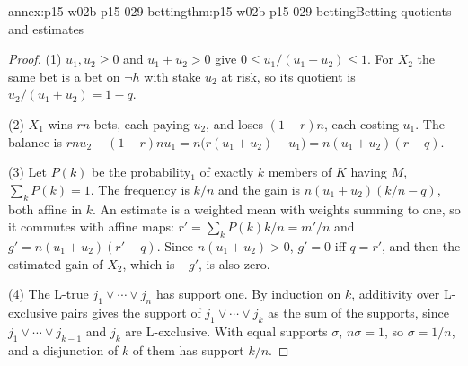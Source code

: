 \begin{annexitem}{annex:p15-w02b-p15-029-betting}{thm:p15-w02b-p15-029-betting}{Betting quotients and estimates}
\begin{proof}
(1) \(u_1,u_2\geq0\) and \(u_1+u_2>0\) give
\(0\leq u_1/(u_1+u_2)\leq1\). For \(X_2\) the same bet is a bet on
\(\neg h\) with stake \(u_2\) at risk, so its quotient is
\(u_2/(u_1+u_2)=1-q\).

(2) \(X_1\) wins \(rn\) bets, each paying \(u_2\), and loses
\((1-r)n\), each costing \(u_1\). The balance is
\(rnu_2-(1-r)nu_1=n\bigl(r(u_1+u_2)-u_1\bigr)=n(u_1+u_2)(r-q)\).

(3) Let \(P(k)\) be the probability\(_1\) of exactly \(k\) members of
\(K\) having \(M\), \(\sum_kP(k)=1\). The frequency is \(k/n\) and the
gain is \(n(u_1+u_2)(k/n-q)\), both affine in \(k\). An estimate is a
weighted mean with weights summing to one, so it commutes with affine
maps: \(r'=\sum_kP(k)k/n=m'/n\) and
\(g'=n(u_1+u_2)(r'-q)\). Since \(n(u_1+u_2)>0\), \(g'=0\) iff
\(q=r'\), and then the estimated gain of \(X_2\), which is \(-g'\),
is also zero.

(4) The L-true \(j_1\lor\cdots\lor j_n\) has support one. By induction
on \(k\), additivity over L-exclusive pairs gives the support of
\(j_1\lor\cdots\lor j_k\) as the sum of the supports, since
\(j_1\lor\cdots\lor j_{k-1}\) and \(j_k\) are L-exclusive. With equal
supports \(\sigma\), \(n\sigma=1\), so \(\sigma=1/n\), and a disjunction
of \(k\) of them has support \(k/n\).
\end{proof}
\end{annexitem}

